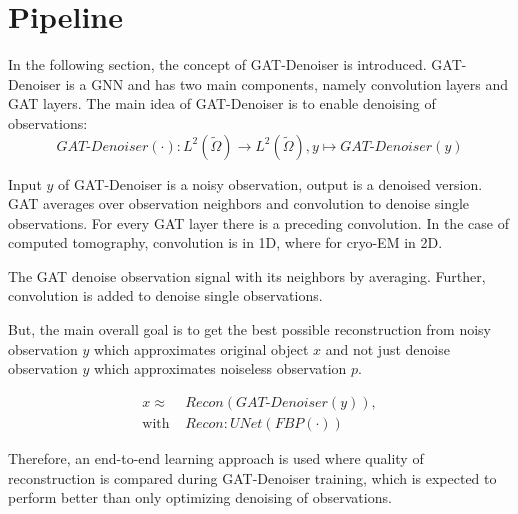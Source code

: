 \section{Pipeline}
\label{sec:concept}

In the following section, the concept of GAT-Denoiser is introduced. 
GAT-Denoiser is a GNN and has two main components, namely convolution layers and GAT layers.
The main idea of GAT-Denoiser is to enable denoising of observations:
\begin{equation}
  \textit{GAT-Denoiser} (\cdot) : L^2(\tilde{\Omega}) \to  L^2(\tilde{\Omega}) , y \mapsto \textit{GAT-Denoiser} (y) 
\end{equation}


Input $y$ of GAT-Denoiser is a noisy observation, output is a denoised version.
GAT averages over observation neighbors and convolution to denoise single observations. 
For every GAT layer there is a preceding convolution. 
In the case of computed tomography, convolution is in 1D, where for cryo-EM in 2D.

\begin{tcolorbox}[colback=red!5!white,colframe=red!75!black]
  The GAT denoise observation signal with its neighbors by averaging. 
  Further, convolution is added to denoise single observations.
\end{tcolorbox}


But, the main overall goal is to get the best possible reconstruction 
from noisy observation $y$ which approximates original object $x$ and 
not just denoise observation $y$ which approximates noiseless observation $p$.


\begin{equation}
  \begin{aligned}
    x \approx   &\textit{Recon} \left( \textit{GAT-Denoiser} \left( y \right) \right), \\
    \text{with } &\textit{Recon} : \textit{UNet} \left( \textit{FBP} \left( \cdot \right) \right)  
  \end{aligned}
\end{equation}

Therefore, an end-to-end learning approach is used where quality of reconstruction is 
compared during GAT-Denoiser training, which is expected to perform better than 
only optimizing denoising of observations.

